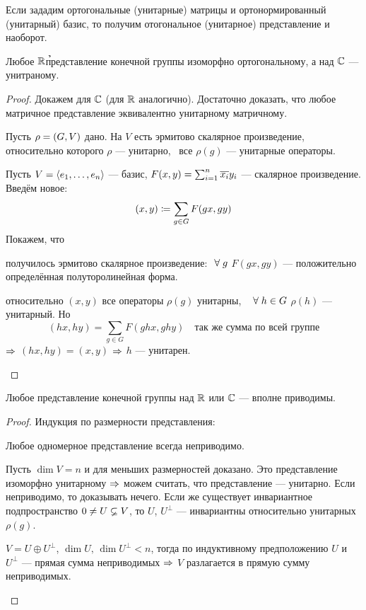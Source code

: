 Если зададим ортогональные (унитарные) матрицы и ортонормированный (унитарный) базис,
то получим отогональное (унитарное) представление и наоборот.

\begin{theorem}
	Любое $\mathbb{R}$\h представление конечной группы изоморфно ортогональному,
	а над $\mathbb{C}$ --- унитраному.
\end{theorem}
\begin{proof}
Докажем для $\mathbb{C}$ (для $\mathbb{R}$ аналогично).
Достаточно доказать, что любое матричное представление
эквивалентно унитарному матричному.

Пусть $\rho = \left(G, V\right)$ дано.
На $V$ есть эрмитово скалярное произведение,
относительно которого $\rho$ --- унитарно, \ie\
все $\rho(g)$ --- унитарные операторы.

Пусть $V = \left\langle e_1 ,\ldots, e_n\right\rangle$ --- базис,
$F(x, y) = \sum_{i = 1}^n \overline{x_i}y_i$ --- скалярное произведение.
Введём новое:
$$
	(x, y) \coloneqq \sum_{g\in G} F(gx, gy)
$$
Покажем, что
\begin{points}{-3}
	\item получилось эрмитово скалярное произведение:
		$~\forall\; g$ $F(gx, gy)$ --- положительно определённая полуторолинейная форма.
	\item относительно $(x, y)$ все операторы $\rho(g)$ унитарны, \ie\
		$~\forall\; h \in G$ $\rho(h)$ --- унитарный. Но
		$$
			(hx, hy) = \sum_{g \in G} F(ghx, ghy) \quad \text{так же сумма по всей группе}
		$$
		$\Rightarrow$ $(hx, hy) = (x, y)$ $\Rightarrow$ $h$ --- унитарен.
\end{points}
\end{proof}
\begin{imp}
	Любое представление конечной группы над $\mathbb{R}$ или $\mathbb{C}$ --- вполне приводимы.
\end{imp}
\begin{proof}
	Индукция по размерности представления:
	\begin{points}{-3}
		\item Любое одномерное представление всегда неприводимо.
		\item Пусть $\dim V = n$ и для меньших размерностей доказано.
			Это представление изоморфно унитарному $\Rightarrow$
			можем считать, что представление --- унитарно.
			Если неприводимо, то доказывать нечего.
			Если же существует инвариантное подпространство $0 \ne U \varsubsetneq V$,
			то $U$, $U^\perp$ --- инвариантны относительно унитарных $\rho(g)$.

			$V = U \oplus U^\perp$, $\dim U, \, \dim U^\perp < n$,
			тогда по индуктивному предположению $U$ и $U^\perp$ --- прямая сумма неприводимых
			$\Rightarrow$ $V$ разлагается в прямую сумму неприводимых.
	\end{points}
\end{proof}


